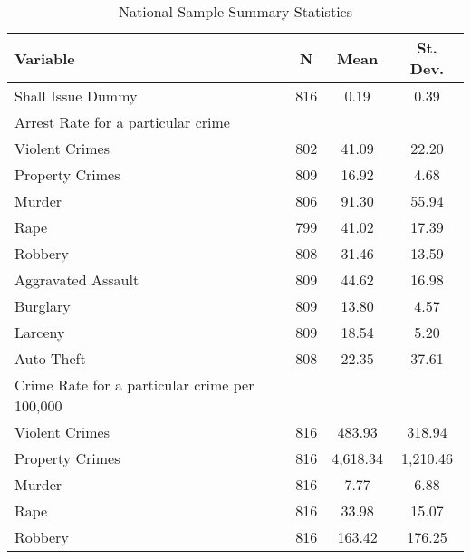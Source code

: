 \documentclass{article}
\begin{document}
\begin{table}[h] \centering 
  \caption{National Sample Summary Statistics} 
  \label{tab:summary} 
\begin{tabular}[t]{@{\extracolsep{5pt}}lccc}
\toprule 
Variable & \multicolumn{1}{c}{N} & \multicolumn{1}{c}{Mean} & \multicolumn{1}{c}{St. Dev.} \\ 
\midrule
Shall Issue Dummy & 816 & 0.19 & 0.39 \\ 
Arrest Rate for a particular crime &&&\\
\hspace{3mm}Violent Crimes & 802 & 41.09 & 22.20 \\ 
\hspace{3mm}Property Crimes & 809 & 16.92 & 4.68 \\ 
\hspace{3mm}Murder & 806 & 91.30 & 55.94 \\ 
\hspace{3mm}Rape & 799 & 41.02 & 17.39 \\ 
\hspace{3mm}Robbery & 808 & 31.46 & 13.59 \\ 
\hspace{3mm}Aggravated Assault & 809 & 44.62 & 16.98 \\ 
\hspace{3mm}Burglary & 809 & 13.80 & 4.57 \\ 
\hspace{3mm}Larceny & 809 & 18.54 & 5.20 \\ 
\hspace{3mm}Auto Theft & 808 & 22.35 & 37.61 \\ 
Crime Rate for a particular crime per 100,000 &&&\\
\hspace{3mm}Violent Crimes & 816 & 483.93 & 318.94 \\ 
\hspace{3mm}Property Crimes & 816 & 4,618.34 & 1,210.46 \\ 
\hspace{3mm}Murder & 816 & 7.77 & 6.88 \\ 
\hspace{3mm}Rape & 816 & 33.98 & 15.07 \\ 
\hspace{3mm}Robbery& 816 & 163.42 & 176.25 \\ 

\end{tabular}
\end{table}
\end{document}
